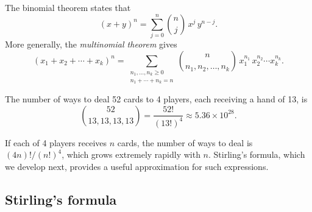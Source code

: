 \documentclass[a4paper]{article}
\begin{document}
\begin{eg}
  The binomial theorem states that
  \[
    (x + y)^n = \sum_{j=0}^{n} \binom{n}{j}\, x^{j}\, y^{n-j}.
  \]
  More generally, the \emph{multinomial theorem} gives
  \[
    (x_1 + x_2 + \cdots + x_k)^n = \sum_{\substack{n_1, \dotsc, n_k \geq 0 \\ n_1 + \cdots + n_k = n}} \binom{n}{n_1, n_2, \dotsc, n_k}\, x_1^{n_1}\, x_2^{n_2} \cdots x_k^{n_k}.
  \]
\end{eg}

\begin{eg}
  The number of ways to deal 52 cards to 4 players, each receiving a hand of 13, is
  \[
    \binom{52}{13, 13, 13, 13} = \frac{52!}{(13!)^4} \approx 5.36\times 10^{28}.
  \]
\end{eg}

\begin{remark}
  If each of 4 players receives $n$ cards, the number of ways to deal is $(4n)!/(n!)^4$, which grows extremely rapidly with $n$. Stirling's formula, which we develop next, provides a useful approximation for such expressions.
\end{remark}
\subsection{Stirling's formula}
\end{document}
